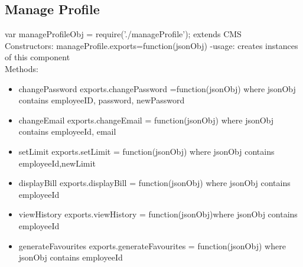 \documentclass[12pt]{article}
\begin{document}
\subsection{Manage Profile}
var manageProfileObj = require('./manageProfile');
extends CMS
\\
Constructors: 
 	manageProfile.exports=function(jsonObj){}
	-usage: creates instances of this component
\\
Methods:
\begin{itemize}
\item changePassword
        exports.changePassword =function(jsonObj){} where jsonObj contains employeeID, password, newPassword
\item changeEmail
	exports.changeEmail = function(jsonObj){} where jsonObj contains employeeId, email
\item setLimit
	exports.setLimit = function(jsonObj){} where jsonObj contains employeeId,newLimit
\item displayBill
	exports.displayBill = function(jsonObj){} where jsonObj contains employeeId
\item viewHistory
	exports.viewHistory = function(jsonObj){}where jsonObj contains employeeId
\item generateFavourites
	exports.generateFavourites = function(jsonObj){} where jsonObj contains employeeId
\end{itemize}
\end{document}
